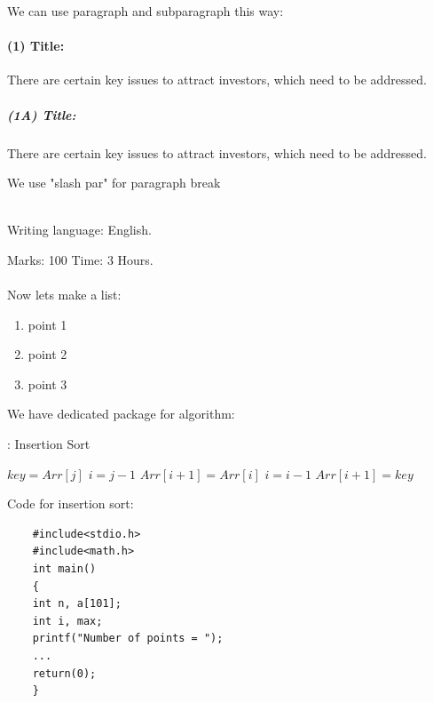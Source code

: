 \documentclass[a4paper,12pt]{article}
\begin{document}
We can use paragraph and subparagraph this way:
\paragraph{(1) Title:}
    There are certain key issues to attract
    investors, which need to be addressed.

    \subparagraph{(1A) Title:}
        There are certain key issues to attract
        investors, which need to be addressed.
\par    %
We use "slash par" for paragraph break \\ \\

\begin{center}
    Writing language: \hspace{5mm} English. \\
\end{center} 
Marks: 100 \hfill Time: 3 Hours.\\ \\






Now lets make a list:
\begin{enumerate}
    \item point 1
    \item point 2
    \item point 3
\end{enumerate}


We have dedicated package for algorithm: \\
\begin{algorithm}[H]
    \caption{: Insertion Sort}
    \begin{algorithmic}[1]
    \State $key = Arr[j]$
    \State $i = j- 1$
                \State $Arr[i+1]=Arr[i]$
                \State $i=i-1$
        \EndWhile
        \State $Arr[i+1]=key$
    \EndFor
    \end{algorithmic}
\end{algorithm}


Code for insertion sort: \\
\begin{verbatim}
    #include<stdio.h>
    #include<math.h>
    int main()
    {
    int n, a[101];
    int i, max;
    printf("Number of points = ");
    ...
    return(0);
    }
\end{verbatim}
\end{document}
